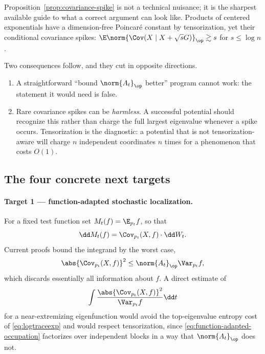 \documentclass[../../main.tex]{subfiles}
\begin{document}
Proposition~\ref{prop:covariance-spike} is not a technical nuisance; it is the sharpest available
guide to what a correct argument can look like. Products of centered exponentials have a
dimension-free Poincar\'e constant by tensorization, yet their conditional covariance spikes:
$\E\norm{\Cov(X\mid X+\sqrt sG)}_\op\gtrsim s$ for $s\le\log n$.

Two consequences follow, and they cut in opposite directions.

\begin{enumerate}[label=(\arabic*),leftmargin=2.4em]
  \item A straightforward ``bound $\norm{A_t}_\op$ better'' program cannot work: the statement it
  would need is false.
  \item Rare covariance spikes can be \emph{harmless}. A successful potential should recognize
  this rather than charge the full largest eigenvalue whenever a spike occurs. Tensorization is
  the diagnostic: a potential that is not tensorization-aware will charge $n$ independent
  coordinates $n$ times for a phenomenon that costs $O(1)$.
\end{enumerate}

\subsection{The four concrete next targets}
\label{subsec:synthesis-targets}

\paragraph{Target 1 --- function-adapted stochastic localization.}
For a fixed test function set $M_t(f)=\E_{p_t}f$, so that
\begin{equation}
  \dd M_t(f)=\Cov_{p_t}(X,f)\cdot\dd W_t .
  \label{eq:function-adapted-sde}
\end{equation}
Current proofs bound the integrand by the worst case,
\begin{equation}
  \abs{\Cov_{p_t}(X,f)}^2\le\norm{A_t}_\op\Var_{p_t}f ,
  \label{eq:worst-case-step}
\end{equation}
which discards essentially all information about $f$. A direct estimate of
\begin{equation}
  \int\frac{\abs{\Cov_{p_t}(X,f)}^2}{\Var_{p_t}f}\dd t
  \label{eq:function-adapted-occupation}
\end{equation}
for a near-extremizing eigenfunction would avoid the top-eigenvalue entropy cost of
\eqref{eq:logtraceexp} and would respect tensorization, since \eqref{eq:function-adapted-occupation}
factorizes over independent blocks in a way that $\norm{A_t}_\op$ does not.
\end{document}
